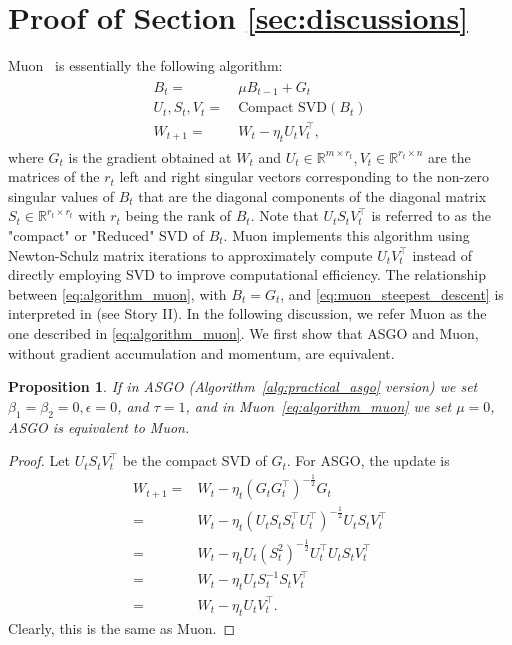 \documentclass{article}
\newtheorem{proposition}{Proposition}
\theoremstyle{remark}
\newcommand{\RR}{\mathbb{R}}
\begin{document}
\section{Proof of Section \ref{sec:discussions}}\label{appendix:proof_discussion_section}
Muon~\citep{jordan2024muon} is essentially the following algorithm:
\begin{align}\label{eq:algorithm_muon}
\begin{split}
    B_t =& \ \mu B_{t-1} + G_t \\
    U_t, S_t, V_t =& \ \text{Compact SVD}(B_t) \\
    W_{t+1} =& \ W_t - \eta_t U_t V_t^\top,
\end{split}
\end{align}
where $G_t$ is the gradient obtained at $W_t$ and $U_t \in \RR^{m \times r_t},V_t \in \RR^{r_t \times n}$ are the matrices of the $r_t$ left and right singular vectors corresponding to the non-zero singular values of $B_t$ that are the diagonal components of the diagonal matrix $S_t \in \RR^{r_t \times r_t}$ with $r_t$ being the rank of $B_t$. Note that $U_t S_t V_t^\top$ is referred to as the "compact" or "Reduced" SVD of $B_t$. Muon implements this algorithm using Newton-Schulz matrix iterations to approximately compute $U_tV_t^\top$ instead of directly employing SVD to improve computational efficiency. The relationship between \eqref{eq:algorithm_muon}, with $B_t = G_t$, and \eqref{eq:muon_steepest_descent} is interpreted in \citet{bernstein2024old} (see Story II). In the following discussion, we refer Muon as the one described in \eqref{eq:algorithm_muon}. We first show that ASGO and Muon, without gradient accumulation and momentum, are equivalent.
\begin{proposition}
    If in ASGO (Algorithm~\ref{alg:practical_asgo} version) we set $\beta_1 = \beta_2 = 0, \epsilon = 0$, and $\tau=1$, and in Muon~\eqref{eq:algorithm_muon} we set $\mu = 0$, ASGO is equivalent to Muon.
\end{proposition}
\begin{proof}
    Let $U_t S_t V_t^\top$ be the compact SVD of $G_t$. For ASGO, the update is
    \begin{align*}
        W_{t+1} =& W_t - \eta_t (G_tG_t^\top)^{-\frac{1}{2}} G_t \\
        =& W_t - \eta_t ({U}_t{S}_t{S}_t^\top {U}_t^\top)^{-\frac{1}{2}} {U}_t {S}_t {V}_t^\top \\
        =& W_t - \eta_t {U}_t ({S}_t^2 )^{-\frac{1}{2}} {U}_t^\top {U}_t {S}_t {V}_t^\top \\
        =& W_t - \eta_t {U}_t {S}_t^{-1} {S}_t {V}_t^\top \\
        =& W_t - \eta_t {U}_t{V}_t^\top.
    \end{align*}
    Clearly, this is the same as Muon.
\end{proof}
\end{document}
